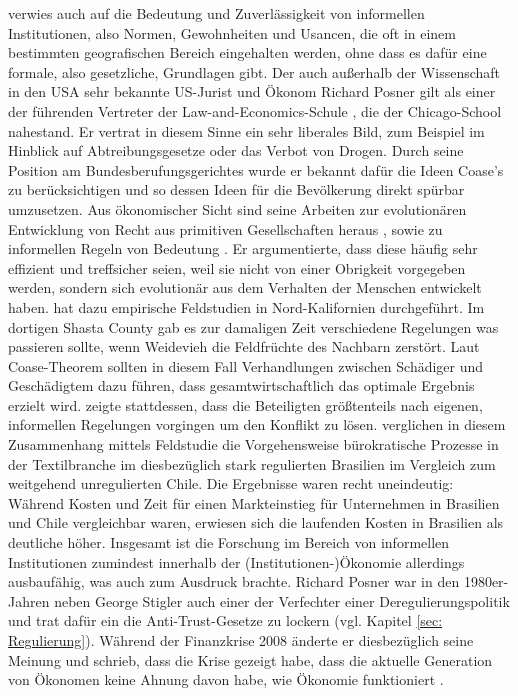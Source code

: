 \textcite[S. 43]{North1990} verwies auch auf die Bedeutung und Zuverlässigkeit von informellen Institutionen, also Normen, Gewohnheiten und Usancen, die oft in einem bestimmten geografischen Bereich eingehalten werden, ohne dass es dafür eine formale, also gesetzliche, Grundlagen gibt. Der auch außerhalb der Wissenschaft in den USA sehr bekannte US-Jurist und Ökonom Richard Posner gilt als einer der führenden Vertreter der Law-and-Economics-Schule \parencite[S. 263]{Warsh}, die der Chicago-School nahestand. Er vertrat in diesem Sinne ein sehr liberales Bild, zum Beispiel im Hinblick auf Abtreibungsgesetze oder das Verbot von Drogen. Durch seine Position am Bundesberufungsgerichtes wurde er bekannt dafür die Ideen Coase's zu berücksichtigen und so dessen Ideen für die Bevölkerung direkt spürbar umzusetzen. Aus ökonomischer Sicht sind seine Arbeiten zur evolutionären Entwicklung von Recht aus primitiven Gesellschaften heraus \parencite{Posner1980}, sowie zu informellen Regeln von Bedeutung \parencite{Posner1983}. Er argumentierte, dass diese häufig sehr effizient und treffsicher seien, weil sie nicht von einer Obrigkeit vorgegeben werden, sondern sich evolutionär aus dem Verhalten der Menschen entwickelt haben. \textcite{Ellickson1991, Ellickson1994} hat dazu empirische Feldstudien in Nord-Kalifornien durchgeführt. Im dortigen Shasta County gab es zur damaligen Zeit verschiedene Regelungen was passieren sollte, wenn Weidevieh die Feldfrüchte des Nachbarn zerstört. Laut Coase-Theorem sollten in diesem Fall Verhandlungen zwischen Schädiger und Geschädigtem dazu führen, dass gesamtwirtschaftlich das optimale Ergebnis erzielt wird. \textcite{Ellickson1991} zeigte stattdessen, dass die Beteiligten größtenteils nach eigenen, informellen Regelungen vorgingen um den Konflikt zu lösen. \textcite{Stone1996} verglichen in diesem Zusammenhang mittels Feldstudie die Vorgehensweise bürokratische Prozesse in der Textilbranche im diesbezüglich stark regulierten Brasilien im Vergleich zum weitgehend unregulierten Chile. Die Ergebnisse waren recht uneindeutig: Während Kosten und Zeit für einen Markteinstieg für Unternehmen in Brasilien und Chile vergleichbar waren, erwiesen sich die laufenden Kosten in Brasilien als deutliche höher. Insgesamt ist die Forschung im Bereich von informellen Institutionen zumindest innerhalb der (Institutionen-)Ökonomie allerdings ausbaufähig, was \textcite{North1990} auch zum Ausdruck brachte. Richard Posner war in den 1980er-Jahren neben George Stigler auch einer der Verfechter einer Deregulierungspolitik und trat dafür ein die Anti-Trust-Gesetze zu lockern (vgl. Kapitel \ref{sec: Regulierung}). Während der Finanzkrise 2008 änderte er diesbezüglich seine Meinung und schrieb, dass die Krise gezeigt habe, dass die aktuelle Generation von Ökonomen keine Ahnung davon habe, wie Ökonomie funktioniert \parencite{Posner1999}.

